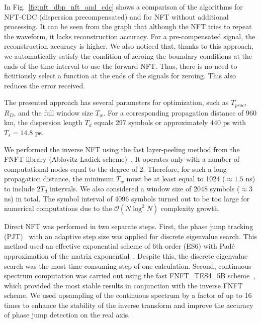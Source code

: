 In Fig.~\ref{fig:nft_dbp_nft_and_cdc} shows a comparison of the algorithms for NFT-CDC (dispersion precompensated) and for NFT without additional processing.
It can be seen from the graph that although the NFT tries to repeat the waveform, it lacks reconstruction accuracy. For a pre-compensated signal, the reconstruction accuracy is higher. We also noticed that, thanks to this approach, we automatically satisfy the condition of zeroing the boundary conditions at the ends of the time interval to use the forward NFT. Thus, there is no need to fictitiously select a function at the ends of the signals for zeroing. This also reduces the error received.



The presented approach has several parameters for optimization, such as $T_{proc}$, $R_D$, and the full window size $T_{w}$. For a corresponding propagation distance of 960 km, the dispersion length $T_d$ equals 297 symbols or approximately $440$ ps with $T_s=14.8$ ps.

We performed the inverse NFT using the fast layer-peeling method from the FNFT library (Ablovitz-Ladick scheme)~\cite{Wahls2016}. It operates only with a number of computational nodes equal to the degree of 2. Therefore, for such a long propagation distance, the minimum $T_w$ must be at least equal to 1024 ($\approx 1.5$ ns) to include $2 T_d$ intervals. We also considered a window size of 2048 symbols ($\approx 3$ ns) in total. The symbol interval of 4096 symbols turned out to be too large for numerical computations due to the $\mathcal{O}(N \log^2 N)$ complexity growth.

Direct NFT was performed in two separate steps. First, the phase jump tracking (PJT)~\cite{chekhovskoy2020introducing, 9542265} with an adaptive step size was applied for discrete eigenvalue search. This method used an effective exponential scheme of 6th order (ES6) with Pad\'e approximation of the matrix exponential~\cite{Medvedev2022}. Despite this, the discrete eigenvalue search was the most time-consuming step of one calculation.
%
Second, continuous spectrum computation was carried out using the fast FNFT\_TES4\_5B scheme~\cite{Medvedev2020_OE, Prins2018a}, which provided the most stable results in conjunction with the inverse FNFT scheme.
%
We used upsampling of the continuous spectrum by a factor of up to 16 times to enhance the stability of the inverse transform and improve the accuracy of phase jump detection on the real axis.


